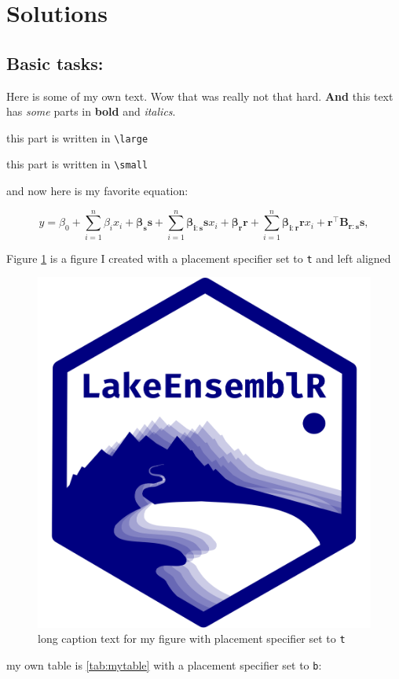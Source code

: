 \documentclass{article}
\numberwithin{equation}{section}
\begin{document}
\section{Solutions}\label{sec:solutions}

\subsection{Basic tasks:}

Here is some of my own text. Wow that was really not that hard. \textbf{And} this text has \textit{some} parts in \textbf{bold} and \textit{italics}.

{\large this part is written in \texttt{\textbackslash large}}

{\small this part is written in \texttt{\textbackslash small}}

and now here is my favorite equation:

\begin{equation}
	y = \beta_0 + \sum_{i=1}^{n}\beta_i  x_i +  \bm{\beta_{s}} \bm{s} +
	\sum_{i=1}^{n} \bm{\beta_{i:s}} \bm{s} x_i + \bm{\beta_{r}}  \bm{r} +
	\sum_{i=1}^{n} \bm{\beta_{i:r}} \bm{r} x_i + \bm{r}^\intercal \bm{B_{r:s}} \bm{s},
\end{equation}

Figure \ref{fig:myfigure} is a figure I created with a placement specifier set to \texttt{t} and left aligned

\begin{figure}[t]
	\raggedright
	\includegraphics[width=0.25\linewidth]{my_image}
	\caption[short text]{long caption text for my figure with placement specifier set to \texttt{t}}\label{fig:myfigure}
\end{figure}

my own table is \autoref{tab:mytable} with a placement specifier set to \texttt{b}:
\end{document}
